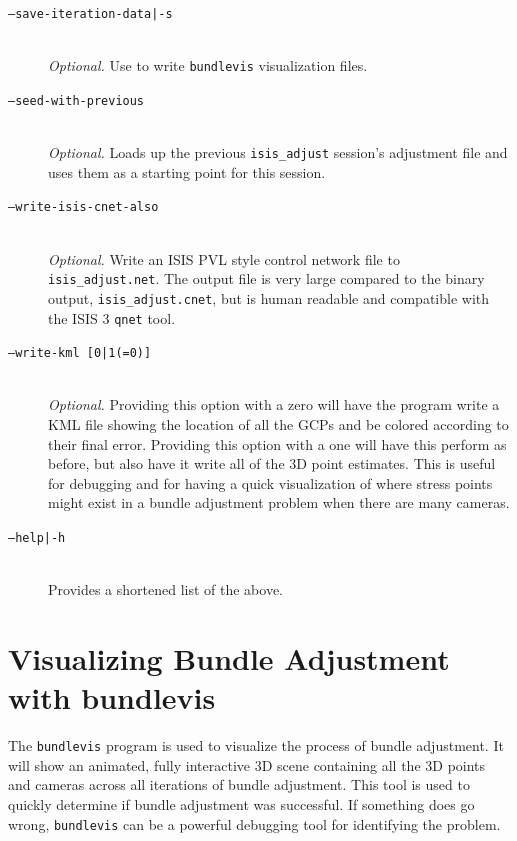 \begin{description}
\item[\texttt{--save-iteration-data|-s}] \hfill \\
  \emph{Optional.} Use to write {\tt bundlevis} visualization files.

\item[\texttt{--seed-with-previous}] \hfill \\
  \emph{Optional.} Loads up the previous {\tt isis\_adjust} session's
  adjustment file and uses them as a starting point for this session.

\item[\texttt{--write-isis-cnet-also}] \hfill \\
  \emph{Optional.} Write an \ac{ISIS} \ac{PVL} style control network file to
  \texttt{isis\_adjust.net}. The output file is very large compared to
  the binary output, \texttt{isis\_adjust.cnet}, but is human readable
  and compatible with the \ac{ISIS} 3 \texttt{qnet} tool.

\item[\texttt{--write-kml [0|1(=0)]}] \hfill \\
  \emph{Optional.} Providing this option with a zero will have the
  program write a \ac{KML} file showing the location of all the \acp{GCP}
  and be colored according to their final error. Providing this
  option with a one will have this perform as before, but also have it
  write all of the 3D point estimates. This is useful for debugging and
  for having a quick visualization of where stress points might exist in
  a bundle adjustment problem when there are many cameras.

\item[\texttt{--help|-h}] \hfill \\
  Provides a shortened list of the above.

\end{description}

\section{Visualizing Bundle Adjustment with bundlevis}

The \texttt{bundlevis} program is used to visualize the process of
bundle adjustment. It will show an animated, fully interactive 3D
scene containing all the 3D points and cameras across all iterations
of bundle adjustment.  This tool is used to quickly determine if
bundle adjustment was successful.  If something does go wrong,
\texttt{bundlevis} can be a powerful debugging tool for identifying
the problem.

